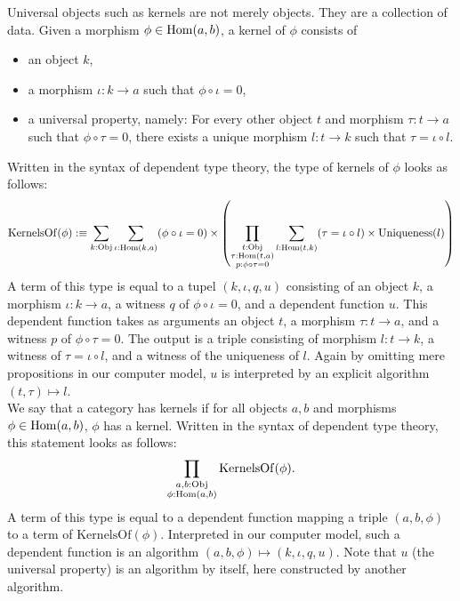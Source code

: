 \begin{example}[Kernels]
 Universal objects such as kernels are not merely objects. They are a collection of data.
 Given a morphism $\phi \in \operatorname{\mathrm{Hom}}(a,b)$, a kernel of $\phi$ consists of
 \begin{itemize}
  \item an object $k$,
  \item a morphism $\iota: k \rightarrow a$ such that $\phi \circ \iota = 0$,
  \item a universal property, namely: For every other object $t$ and morphism $\tau: t \rightarrow a$
        such that $\phi \circ \tau = 0$, there exists a unique morphism $l: t \rightarrow k$
        such that $\tau = \iota \circ l$.
 \end{itemize}
 Written in the syntax of dependent type theory, the type of kernels of $\phi$
 looks as follows:
 \begin{align*}
  \mathrm{KernelsOf}(\phi):\equiv
  \sum_{k:\mathrm{Obj}} \sum_{\iota: \operatorname{\mathrm{Hom}}(k,a)} (\phi \circ \iota = 0) \times \left( \prod_{ \substack{ t: \mathrm{Obj} \\ \tau: \operatorname{\mathrm{Hom}}( t, a ) \\ p: \phi \circ \tau = 0}} 
  \sum_{l: \operatorname{\mathrm{Hom}}( t, k )} (\tau = \iota \circ l) \times \mathrm{Uniqueness}( l ) \right)
 \end{align*}
 A term of this type is equal to a tupel $(k, \iota, q, u )$ consisting of an object $k$,
 a morphism $\iota: k \rightarrow a$, a witness $q$ of $\phi \circ \iota = 0$, and a dependent function $u$.
 This dependent function takes as arguments an object $t$, a morphism $\tau: t \rightarrow a$, and a witness $p$ of $\phi \circ \tau = 0$.
 The output is a triple consisting of morphism $l: t \rightarrow k$, a witness of $\tau = \iota \circ l$, and a witness of the uniqueness of $l$.
 Again by omitting mere propositions in our computer model,
 $u$ is interpreted by an explicit algorithm $(t, \tau) \mapsto l$.
 \\
 We say that a category has kernels if for all objects $a,b$ and morphisms $\phi \in \operatorname{\mathrm{Hom}}( a, b )$,
 $\phi$ has a kernel.
 Written in the syntax of dependent type theory, this statement looks as follows:
 \[
  \prod_{ \substack{ a,b: \mathrm{Obj} \\ \phi: \operatorname{\mathrm{Hom}}(a,b) } } \mathrm{KernelsOf}( \phi ).
 \]
 A term of this type is equal to a dependent function mapping a triple $(a,b,\phi)$
 to a term of $\mathrm{KernelsOf}( \phi )$.
 Interpreted in our computer model, such a dependent function is an algorithm 
 $(a,b,\phi) \mapsto (k, \iota, q, u )$. Note that $u$ (the universal property) is an algorithm by itself,
 here constructed by another algorithm.
\end{example}

